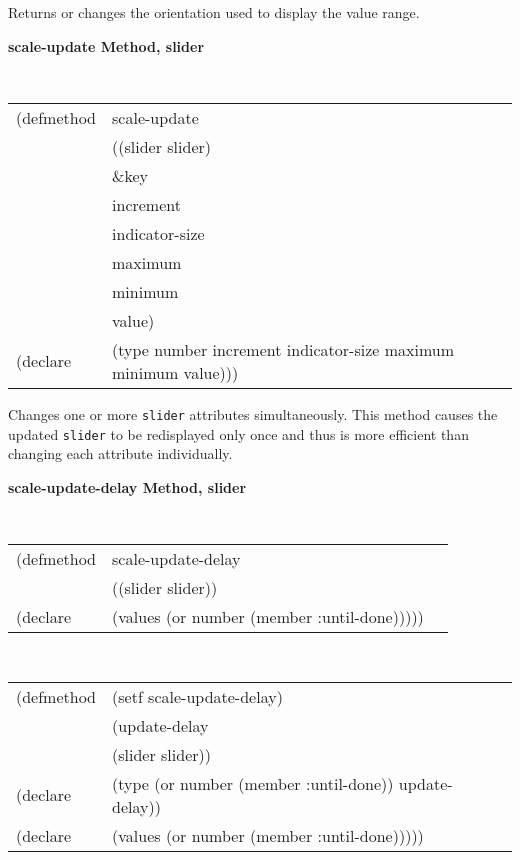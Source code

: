\begin{flushright} \parbox[t]{6.125in}{
Returns or changes the orientation used to display the value range.}
\end{flushright}

{\samepage  
{\large {\bf scale-update \hfill Method, slider}}
\begin{flushright} \parbox[t]{6.125in}{
\tt
\begin{tabular}{lll}
\raggedright
(defmethod & scale-update & \\
& ((slider  slider) \\
& \&key \\
& increment \\
& indicator-size \\
& maximum \\
& minimum \\
& value)\\
(declare & (type number increment indicator-size maximum minimum value)))
\end{tabular}
\rm

}\end{flushright}}

\begin{flushright} \parbox[t]{6.125in}{
Changes one or more {\tt slider} attributes simultaneously. This method causes
the updated {\tt slider} to be redisplayed only once and thus is more efficient
than changing each attribute individually.} \end{flushright}



{\samepage  
{\large {\bf scale-update-delay \hfill Method, slider}}
\begin{flushright} \parbox[t]{6.125in}{
\tt
\begin{tabular}{lll}
\raggedright
(defmethod & scale-update-delay & \\
& ((slider  slider)) \\
(declare & (values (or number (member :until-done)))))
\end{tabular}
\rm

}\end{flushright}}

\begin{flushright} \parbox[t]{6.125in}{
\tt
\begin{tabular}{lll}
\raggedright
(defmethod & (setf scale-update-delay) & \\
         & (update-delay \\
         & (slider  slider)) \\
(declare &(type (or number (member :until-done))  update-delay))\\
(declare & (values (or number (member :until-done)))))
\end{tabular}
\rm}
\end{flushright}

